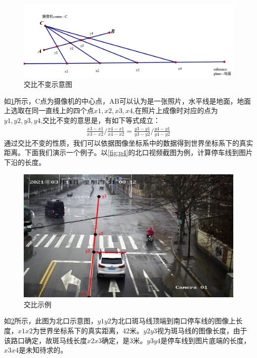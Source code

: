 \begin{figure}[H]
    \centering
    \includegraphics[scale=0.5]{figures/交比不变示意图.png}
    \caption{交比不变示意图}
    \label{fig:p8}
\end{figure}
如\ref{fig:p8}所示，C点为摄像机的中心点，AB可以认为是一张照片，水平线是地面，地面上选取在同一直线上的四个点$x1,x2,x3,x4$,在照片上成像时对应的点为$y1,y2,y3,y4$,交比不变的意思是，有如下等式成立：
\begin{equation}
    \begin{aligned}
        \frac{x3-x1}{x3-x2}/\frac{x4-x1}{x4-x2}=\frac{y3-y1}{y3-y2}/\frac{y4-y1}{y4-y2}
    \end{aligned}
\end{equation}
通过交比不变的性质，我们可以依据图像坐标系中的数据得到世界坐标系下的真实距离。下面我们演示一个例子。以\ref{fig:p4}的北口视频截图为例，计算停车线到图片下沿的长度。
\begin{figure}[H]
    \centering
    \includegraphics[scale=0.5]{figures/交比示例.png}
    \caption{交比示例}
    \label{fig:交比}
\end{figure}

如\ref{fig:交比}所示，此图为北口示意图，$y1y2$为北口斑马线顶端到南口停车线的图像上长度，$x1x2$为世界坐标系下的真实距离，42米。$y2y3$视为斑马线的图像长度，由于该路口确定，故斑马线长度$x2x3$确定，是3米。$y3y4$是停车线到图片底端的长度，$x3x4$是未知待求的。

